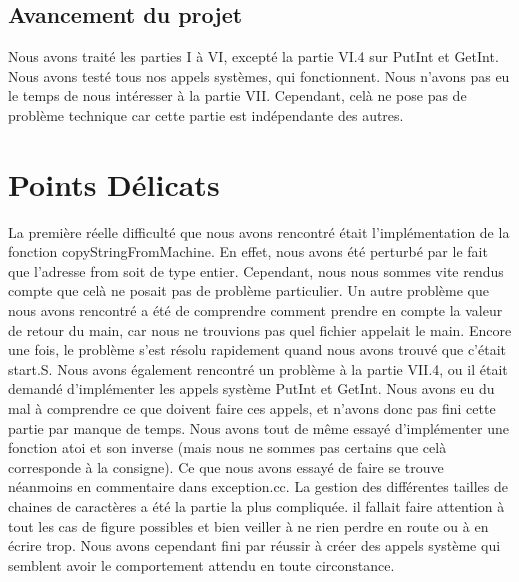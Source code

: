 \documentclass[12pt]{article}
\begin{document}
\bigbreak
\subsection{Avancement du projet}
Nous avons traité les parties I à VI, excepté la partie VI.4 sur \textcolor{blue2}{PutInt} et \textcolor{blue2}{GetInt}. Nous avons testé tous nos appels systèmes, qui fonctionnent. Nous n'avons pas eu le temps de nous intéresser à la partie VII. Cependant, celà ne pose pas de problème technique car cette partie est indépendante des autres.

\bigbreak
\bigbreak
\section {Points Délicats}
La première réelle difficulté que nous avons rencontré était l'implémentation de la fonction \textcolor{red2}{copyStringFromMachine}. En effet, nous avons été perturbé par le fait que l'adresse from soit de type entier. Cependant, nous nous sommes vite rendus compte que celà ne posait pas de problème particulier.
\newline \newline
Un autre problème que nous avons rencontré a été de comprendre comment prendre en compte la valeur de retour du main, car nous ne trouvions pas quel fichier appelait le main. Encore une fois, le problème s'est résolu rapidement quand nous avons trouvé que c'était \textcolor{vert2}{start.S}.
\newline \newline
Nous avons également rencontré un problème à la partie VII.4, ou il était demandé d'implémenter les appels système \textcolor{blue2}{PutInt} et \textcolor{blue2}{GetInt}. Nous avons eu du mal à comprendre ce que doivent faire ces appels, et n'avons donc pas fini cette partie par manque de temps.
Nous avons tout de même essayé d'implémenter une fonction \textcolor{red2}{atoi} et son inverse (mais nous ne sommes pas certains que celà corresponde à la consigne). Ce que nous avons essayé de faire se trouve néanmoins en commentaire dans \textcolor{vert2}{exception.cc}.
\newline \newline
La gestion des différentes tailles de chaines de caractères a été la partie la plus compliquée. il fallait faire attention à tout les cas de figure possibles et bien veiller à ne rien perdre en route ou à en écrire trop. Nous avons cependant fini par réussir à créer des appels système qui semblent avoir le comportement attendu en toute circonstance.
\bigbreak
\bigbreak
\end{document}
